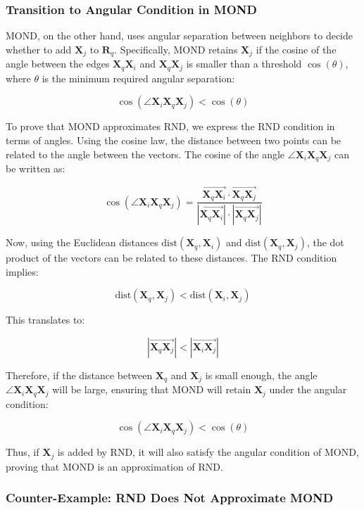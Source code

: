 \subsubsection{Transition to Angular Condition in MOND}

MOND, on the other hand, uses angular separation between neighbors to decide whether to add \(\mathbf{X}_j\) to \(\mathbf{R}_q\). Specifically, MOND retains \(\mathbf{X}_j\) if the cosine of the angle between the edges \(\mathbf{X}_q \mathbf{X}_i\) and \(\mathbf{X}_q \mathbf{X}_j\) is smaller than a threshold \(\cos(\theta)\), where \(\theta\) is the minimum required angular separation:

\[
\cos(\angle \mathbf{X}_i \mathbf{X}_q \mathbf{X}_j) < \cos(\theta)
\]

To prove that MOND approximates RND, we express the RND condition in terms of angles. Using the cosine law, the distance between two points can be related to the angle between the vectors. The cosine of the angle \(\angle \mathbf{X}_i \mathbf{X}_q \mathbf{X}_j\) can be written as:

\[
\cos(\angle \mathbf{X}_i \mathbf{X}_q \mathbf{X}_j) = \frac{\overrightarrow{\mathbf{X}_q \mathbf{X}_i} \cdot \overrightarrow{\mathbf{X}_q \mathbf{X}_j}}{|\overrightarrow{\mathbf{X}_q \mathbf{X}_i}| \cdot |\overrightarrow{\mathbf{X}_q \mathbf{X}_j}|}
\]

Now, using the Euclidean distances \(\text{dist}(\mathbf{X}_q, \mathbf{X}_i)\) and \(\text{dist}(\mathbf{X}_q, \mathbf{X}_j)\), the dot product of the vectors can be related to these distances. The RND condition implies:

\[
\text{dist}(\mathbf{X}_q, \mathbf{X}_j) < \text{dist}(\mathbf{X}_i, \mathbf{X}_j)
\]

This translates to:

\[
|\overrightarrow{\mathbf{X}_q \mathbf{X}_j}| < |\overrightarrow{\mathbf{X}_i \mathbf{X}_j}|
\]

Therefore, if the distance between \(\mathbf{X}_q\) and \(\mathbf{X}_j\) is small enough, the angle \(\angle \mathbf{X}_i \mathbf{X}_q \mathbf{X}_j\) will be large, ensuring that MOND will retain \(\mathbf{X}_j\) under the angular condition:

\[
\cos(\angle \mathbf{X}_i \mathbf{X}_q \mathbf{X}_j) < \cos(\theta)
\]

Thus, if \(\mathbf{X}_j\) is added by RND, it will also satisfy the angular condition of MOND, proving that MOND is an approximation of RND.

\subsubsection{Counter-Example: RND Does Not Approximate MOND}

